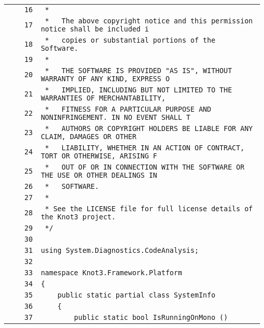 \documentclass[a4paper,10pt]{article}
\begin{document}
\begin{longtable}[l]{lrrl}
\cellcolor{gray} &  & \verb~16~ & \verb~ *~\\
\cellcolor{gray} &  & \verb~17~ & \verb~ *   The above copyright notice and this permission notice shall be included i~\\
\cellcolor{gray} &  & \verb~18~ & \verb~ *   copies or substantial portions of the Software.~\\
\cellcolor{gray} &  & \verb~19~ & \verb~ *~\\
\cellcolor{gray} &  & \verb~20~ & \verb~ *   THE SOFTWARE IS PROVIDED "AS IS", WITHOUT WARRANTY OF ANY KIND, EXPRESS O~\\
\cellcolor{gray} &  & \verb~21~ & \verb~ *   IMPLIED, INCLUDING BUT NOT LIMITED TO THE WARRANTIES OF MERCHANTABILITY,~\\
\cellcolor{gray} &  & \verb~22~ & \verb~ *   FITNESS FOR A PARTICULAR PURPOSE AND NONINFRINGEMENT. IN NO EVENT SHALL T~\\
\cellcolor{gray} &  & \verb~23~ & \verb~ *   AUTHORS OR COPYRIGHT HOLDERS BE LIABLE FOR ANY CLAIM, DAMAGES OR OTHER~\\
\cellcolor{gray} &  & \verb~24~ & \verb~ *   LIABILITY, WHETHER IN AN ACTION OF CONTRACT, TORT OR OTHERWISE, ARISING F~\\
\cellcolor{gray} &  & \verb~25~ & \verb~ *   OUT OF OR IN CONNECTION WITH THE SOFTWARE OR THE USE OR OTHER DEALINGS IN~\\
\cellcolor{gray} &  & \verb~26~ & \verb~ *   SOFTWARE.~\\
\cellcolor{gray} &  & \verb~27~ & \verb~ *~\\
\cellcolor{gray} &  & \verb~28~ & \verb~ * See the LICENSE file for full license details of the Knot3 project.~\\
\cellcolor{gray} &  & \verb~29~ & \verb~ */~\\
\cellcolor{gray} &  & \verb~30~ & \verb~~\\
\cellcolor{gray} &  & \verb~31~ & \verb~using System.Diagnostics.CodeAnalysis;~\\
\cellcolor{gray} &  & \verb~32~ & \verb~~\\
\cellcolor{gray} &  & \verb~33~ & \verb~namespace Knot3.Framework.Platform~\\
\cellcolor{gray} &  & \verb~34~ & \verb~{~\\
\cellcolor{gray} &  & \verb~35~ & \verb~    public static partial class SystemInfo~\\
\cellcolor{gray} &  & \verb~36~ & \verb~    {~\\
\cellcolor{gray} &  & \verb~37~ & \verb~        public static bool IsRunningOnMono ()~\\

\end{longtable}
\end{document}
